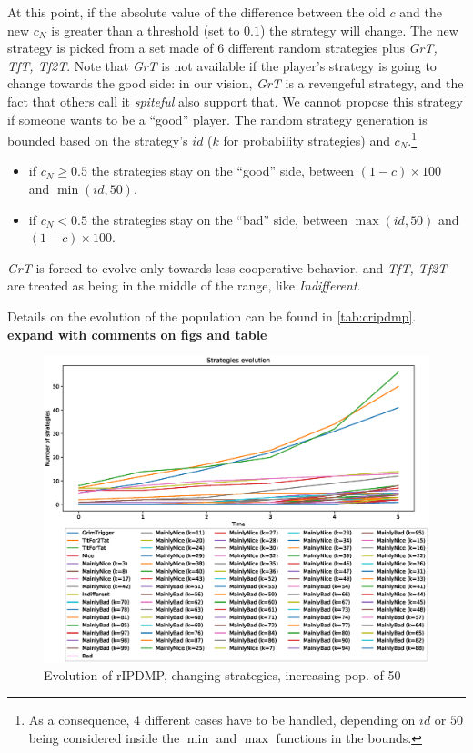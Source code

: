 \documentclass[journal,10pt,twoside]{IEEEtran}
\begin{document}
At this point, if the absolute value of the difference between the old $c$ and the new $c_N$ is greater than a threshold (set to $0.1$) the strategy will change. 
The new strategy is picked from a set made of $6$ different random strategies plus \textit{GrT, TfT, Tf2T}.
Note that \textit{GrT} is not available if the player's strategy is going to change towards the good side: in our vision, \textit{GrT} is a revengeful strategy, and the fact that others call it \textit{spiteful} also support that. We cannot propose this strategy if someone wants to be a ``good'' player.
The random strategy generation is bounded based on the strategy's $id$ ($k$ for probability strategies) and $c_N$.\footnote{As a consequence, 4 different cases have to be handled, depending on $id$ or $50$ being considered inside the $\min$ and $\max$ functions in the bounds.}
\begin{itemize}
    \item if $c_N \ge 0.5$ the strategies stay on the ``good'' side, between $(1-c)\times 100$ and $\min(id,50)$.
    \item if $c_N < 0.5$ the strategies stay on the ``bad'' side, between $\max(id,50)$ and $(1-c)\times 100$.
\end{itemize}
\textit{GrT} is forced to evolve only towards less cooperative behavior, and \textit{TfT, Tf2T} are treated as being in the middle of the range, like \textit{Indifferent}.

Details on the evolution of the population can be found in \autoref{tab:cripdmp}.
\textbf{expand with comments on figs and table}

\begin{figure}[!ht]
    \centering
    \includegraphics[width=1\columnwidth]{../img/cipdmp-incr/alt1/cipdmp-evolution-increasing-pop-50}
    \caption{Evolution of rIPDMP, changing strategies, increasing pop. of 50}
    \label{fig:incrC}
\end{figure}
\end{document}
